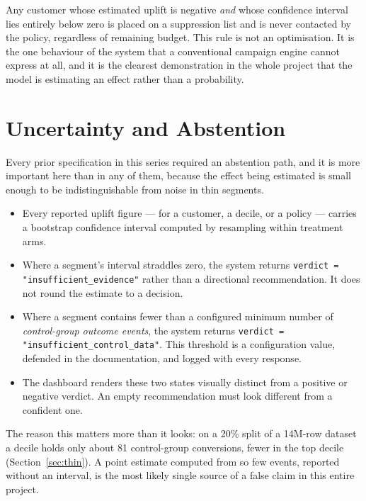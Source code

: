 \documentclass[11pt,a4paper]{article}
\begin{document}
\begin{keybox}
Any customer whose estimated uplift is negative \emph{and} whose confidence interval lies entirely
below zero is placed on a suppression list and is never contacted by the policy, regardless of
remaining budget. This rule is not an optimisation. It is the one behaviour of the system that a
conventional campaign engine cannot express at all, and it is the clearest demonstration in the
whole project that the model is estimating an effect rather than a probability.
\end{keybox}

\section{Uncertainty and Abstention}
\label{sec:abstention}

Every prior specification in this series required an abstention path, and it is more important here
than in any of them, because the effect being estimated is small enough to be indistinguishable
from noise in thin segments.

\begin{itemize}
\item Every reported uplift figure --- for a customer, a decile, or a policy --- carries a bootstrap
confidence interval computed by resampling within treatment arms.
\item Where a segment's interval straddles zero, the system returns
\texttt{verdict = "insufficient\_evidence"} rather than a directional recommendation. It does not
round the estimate to a decision.
\item Where a segment contains fewer than a configured minimum number of \emph{control-group
outcome events}, the system returns \texttt{verdict = "insufficient\_control\_data"}. This threshold
is a configuration value, defended in the documentation, and logged with every response.
\item The dashboard renders these two states visually distinct from a positive or negative verdict.
An empty recommendation must look different from a confident one.
\end{itemize}

\begin{alertbox}
The reason this matters more than it looks: on a 20\% split of a 14M-row dataset a decile holds
only about 81 control-group conversions, fewer in the top decile (Section~\ref{sec:thin}). A
point estimate computed from so few events, reported without an interval, is the most likely single source of a
false claim in this entire project.
\end{alertbox}
\end{document}
